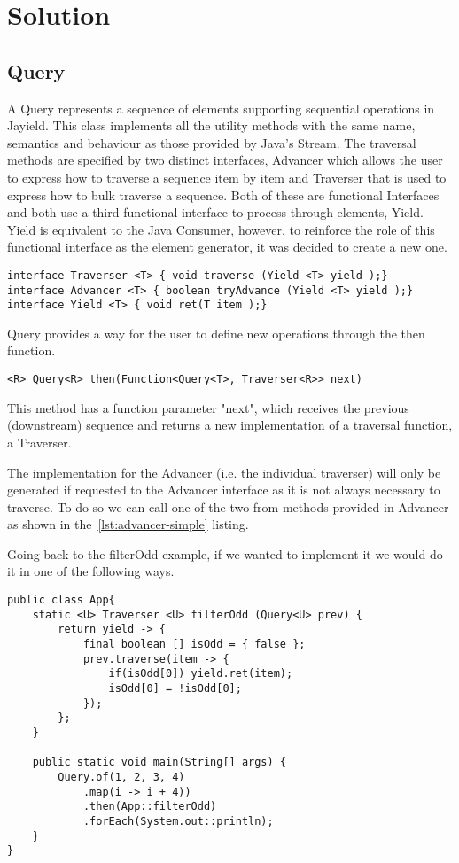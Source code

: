 \chapter{Solution}

\section{Query}

A Query represents a sequence of elements supporting sequential operations in Jayield. This class implements all the utility methods with the same name, semantics and behaviour as those provided by Java's Stream. The traversal methods are specified by two distinct interfaces, Advancer which allows the user to express how to traverse a sequence item by item and Traverser that is used to express how to bulk traverse a sequence. Both of these are functional Interfaces and both use a third functional interface to process through elements, Yield. Yield is equivalent to the Java Consumer, however, to reinforce the role of this functional interface as the element generator, it was decided to create a new one.
\begin{lstlisting}[caption={Interfaces},captionpos=b]
interface Traverser <T> { void traverse (Yield <T> yield );}
interface Advancer <T> { boolean tryAdvance (Yield <T> yield );}
interface Yield <T> { void ret(T item );}
\end{lstlisting}

Query provides a way for the user to define new operations through the then function.
\begin{lstlisting}[caption={Traversal function generator},captionpos=b]
<R> Query<R> then(Function<Query<T>, Traverser<R>> next)
\end{lstlisting}
This method has a function parameter "next", which receives the previous (downstream) sequence and returns a new implementation of a traversal function, a Traverser.


 The implementation for the Advancer (i.e. the individual traverser) will only be generated if requested to the Advancer interface as it is not always necessary to traverse. To do so we can call one of the two from methods provided in Advancer as shown in the~\ref{lst:advancer-simple} listing.

\newpage
Going back to the filterOdd example, if we wanted to implement it we would do it in one of the following ways.
\begin{lstlisting}[caption={filterOdd using Query and Traverser},captionpos=b]
public class App{
	static <U> Traverser <U> filterOdd (Query<U> prev) {
		return yield -> {
			final boolean [] isOdd = { false };
			prev.traverse(item -> {
				if(isOdd[0]) yield.ret(item);
				isOdd[0] = !isOdd[0];
			});
		};
	}

	public static void main(String[] args) {
		Query.of(1, 2, 3, 4)
            .map(i -> i + 4))
            .then(App::filterOdd)
            .forEach(System.out::println);
	}
}
\end{lstlisting}

